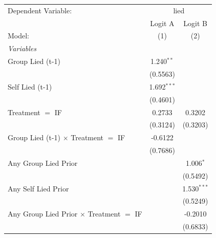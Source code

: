 
\begingroup
\centering
\begin{tabular}{lcc}
   \tabularnewline \midrule \midrule
   Dependent Variable: & \multicolumn{2}{c}{lied}\\
                                                                              & Logit A       & Logit B \\   
   Model:                                                                     & (1)           & (2)\\  
   \midrule
   \emph{Variables}\\
   Group Lied (t-1)                                                           & 1.240$^{**}$  &   \\   
                                                                              & (0.5563)      &   \\   
   Self Lied (t-1)                                                            & 1.692$^{***}$ &   \\   
                                                                              & (0.4601)      &   \\   
   Treatment $=$ IF                                                           & 0.2733        & 0.3202\\   
                                                                              & (0.3124)      & (0.3203)\\   
   Group Lied (t-1) $\times$ Treatment $=$ IF                                 & -0.6122       &   \\   
                                                                              & (0.7686)      &   \\   
   Any Group Lied Prior                                                       &               & 1.006$^{*}$\\   
                                                                              &               & (0.5492)\\   
   Any Self Lied Prior                                                        &               & 1.530$^{***}$\\   
                                                                              &               & (0.5249)\\   
   Any Group Lied Prior $\times$ Treatment $=$ IF                             &               & -0.2010\\   
                                                                              &               & (0.6833)\\   

\end{tabular}
